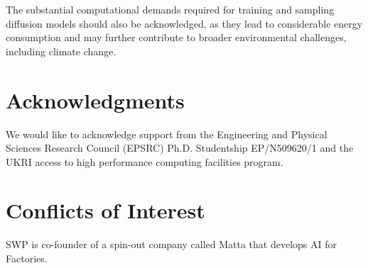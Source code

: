 The substantial computational demands required for training and sampling diffusion models should also be acknowledged, as they lead to considerable energy consumption and may further contribute to broader environmental challenges, including climate change.

\section*{Acknowledgments} We would like to acknowledge support from the Engineering and Physical Sciences Research Council (EPSRC) Ph.D. Studentship EP/N509620/1 and the UKRI access to high performance computing facilities program.

\section*{Conflicts of Interest} SWP is co-founder of a spin-out company called Matta that develops AI for Factories.


